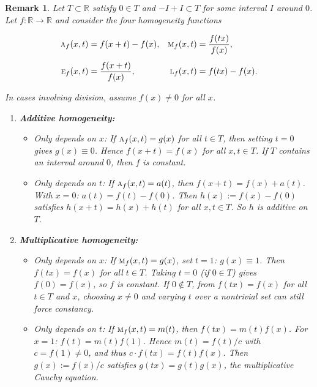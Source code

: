 \documentclass{amsart}
\theoremstyle{plain}
\newtheorem{remark}{Remark}
\numberwithin{equation}{section}
\newcommand{\eh}{\textsc{e}}
\begin{document}
\begin{remark}
    Let \(T \subset \mathbb{R}\) satisfy \(0 \in T\) and \(-I + I \subset T\) for some interval \(I\) around \(0\).  
    Let \(f : \mathbb{R} \to \mathbb{R}\) and consider the four homogeneity functions

    \begin{align*}
        \textsc{a}_f(x,t) &= f(x+t) - f(x), &
        \textsc{m}_f(x,t) &= \frac{f(tx)}{f(x)}, \\[4pt]
        \eh_f(x,t) &= \frac{f(x+t)}{f(x)}, &
        \textsc{l}_f(x,t) &= f(tx) - f(x).
    \end{align*}

    In cases involving division, assume \(f(x) \neq 0\) for all \(x\).

    \begin{enumerate}
        \item \textbf{Additive homogeneity:}  
              \begin{itemize}
                  \item \emph{Only depends on \(x\):} If \(\textsc{a}_f(x,t) = g(x)\) for all \(t \in T\), then setting \(t=0\) gives \(g(x) \equiv 0\). Hence \(f(x+t) = f(x)\) for all \(x,t \in T\). If \(T\) contains an interval around \(0\), then \(f\) is constant.
                  \item \emph{Only depends on \(t\):} If \(\textsc{a}_f(x,t) = a(t)\), then \(f(x+t) = f(x) + a(t)\). With \(x=0\): \(a(t) = f(t) - f(0)\). Then \(h(x):= f(x)-f(0)\) satisfies \(h(x+t) = h(x) + h(t)\) for all \(x,t \in T\). So \(h\) is additive on \(T\).
              \end{itemize}

        \item \textbf{Multiplicative homogeneity:}  
              \begin{itemize}
                  \item \emph{Only depends on \(x\):} If \(\textsc{m}_f(x,t) = g(x)\), set \(t=1\): \(g(x) \equiv 1\). Then \(f(tx) = f(x)\) for all \(t \in T\). Taking \(t=0\) (if \(0 \in T\)) gives \(f(0) = f(x)\), so \(f\) is constant. If \(0 \notin T\), from \(f(tx)=f(x)\) for all \(t \in T\) and \(x\), choosing \(x \neq 0\) and varying \(t\) over a nontrivial set can still force constancy.
                  \item \emph{Only depends on \(t\):} If \(\textsc{m}_f(x,t) = m(t)\), then \(f(tx) = m(t) f(x)\). For \(x=1\): \(f(t) = m(t) f(1)\). Hence \(m(t) = f(t)/c\) with \(c = f(1) \neq 0\), and thus \(c \cdot f(tx) = f(t) f(x)\). Then \(g(x):= f(x)/c\) satisfies \(g(tx) = g(t) g(x)\), the multiplicative Cauchy equation.
              \end{itemize}


\end{enumerate}
\end{remark}
\end{document}
